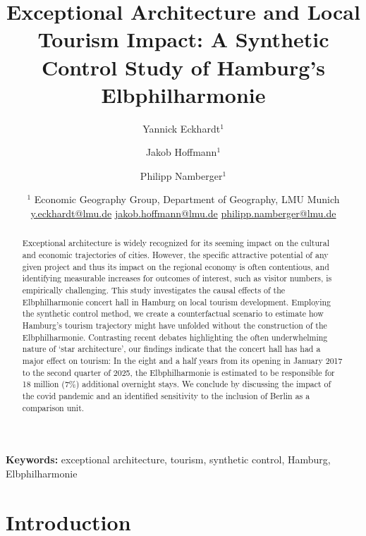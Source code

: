 \documentclass[a4paper, 12pt]{article}
\title{Exceptional Architecture and Local Tourism Impact:
A Synthetic Control Study of Hamburg's Elbphilharmonie}
\author{Yannick Eckhardt$^{1}$ \and Jakob Hoffmann$^{1}$ \and Philipp Namberger$^{1}$}
\date{%
  $^1$ Economic Geography Group, Department of Geography, LMU Munich\\[0.3em]
  \small\href{mailto:y.eckhardt@lmu.de}{y.eckhardt@lmu.de} \quad
  \href{mailto:jakob.hoffmann@lmu.de}{jakob.hoffmann@lmu.de} \quad
  \href{mailto:philipp.namberger@lmu.de}{philipp.namberger@lmu.de}\\[0.3em]
}
\begin{document}
\maketitle


\begin{abstract}
  \noindent Exceptional architecture is widely recognized for its seeming impact on the cultural and economic trajectories of cities. However, the specific attractive potential of any given project and thus its impact on the regional economy is often contentious, and identifying measurable increases for outcomes of interest, such as visitor numbers, is empirically challenging. This study investigates the causal effects of the Elbphilharmonie concert hall in Hamburg on local tourism development. Employing the synthetic control method, we create a counterfactual scenario to estimate how Hamburg's tourism trajectory might have unfolded without the construction of the Elbphilharmonie. Contrasting recent debates highlighting the often underwhelming nature of `star architecture', our findings indicate that the concert hall has had a major effect on tourism: In the eight and a half years from its opening in January 2017 to the second quarter of 2025, the Elbphilharmonie is estimated to be responsible for 18 million (7\%) additional overnight stays. We conclude by discussing the impact of the covid pandemic and an identified sensitivity to the inclusion of Berlin as a comparison unit.
\end{abstract}

\noindent\textbf{Keywords:} exceptional architecture, tourism, synthetic control, Hamburg, Elbphilharmonie

\section{Introduction}
\label{introduction}
\end{document}
